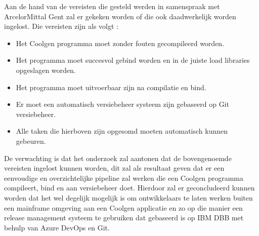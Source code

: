 Aan de hand van de vereisten die gesteld werden in samenspraak met ArcelorMittal Gent zal er gekeken worden of die ook daadwerkelijk worden ingelost.
Die vereisten zijn als volgt :
\begin{itemize}
  \item Het Coolgen programma moet zonder fouten gecompileerd worden.
  \item Het programma moet succesvol gebind worden en in de juiste load libraries opgeslagen worden.
  \item Het programma moet uitvoerbaar zijn na compilatie en bind.
  \item Er moet een automatisch versiebeheer systeem zijn gebaseerd op Git versiebeheer.
  \item Alle taken die hierboven zijn opgesomd moeten automatisch kunnen gebeuren.
\end{itemize}

De verwachting is dat het onderzoek zal aantonen dat de bovengenoemde vereisten ingelost kunnen worden, dit zal als resultaat geven dat er een eenvoudige en overzichtelijke pipeline zal
werken die een Coolgen programma compileert, bind en aan versiebeheer doet.
Hierdoor zal er geconcludeerd kunnen worden dat het wel degelijk mogelijk is om ontwikkelaars te laten werken buiten een mainframe omgeving aan een Coolgen applicatie en zo op die manier een
release management systeem te gebruiken dat gebaseerd is op IBM DBB met behulp van Azure DevOps en Git.
